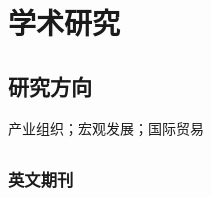 \documentclass[letterpaper]{article}
\begin{document}
\section*{学术研究}

\subsection*{\bf{研究方向}}
产业组织；宏观发展；国际贸易



\subsection*{}

\subsubsection*{英文期刊}
\end{document}
